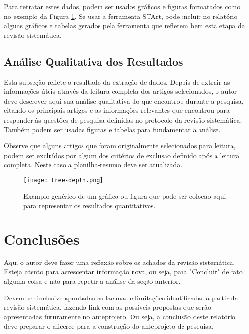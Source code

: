\documentclass[12pt]{article}
\begin{document}
Para retratar estes dados, podem ser usados gráficos e figuras formatados como no exemplo da Figura \ref{fig:depth}. Se usar a ferramenta STArt, pode incluir no relatório alguns gráficos e tabelas gerados pela ferramenta que refletem bem esta etapa da revisão sistemática.

\subsection{Análise Qualitativa dos Resultados}

Esta subseção reflete o resultado da extração de dados. Depois de extrair as informações úteis através da leitura completa dos artigos selecionados, o autor deve descrever aqui sua análise qualitativa do que encontrou durante a pesquisa, citando os principais artigos e as informações relevantes que encontrou para responder às questões de pesquisa definidas no protocolo da revisão sistemática. Também podem ser usadas figuras e tabelas para fundamentar a análise.

Observe que alguns artigos que foram originalmente selecionados para leitura, podem ser excluídos por algum dos critérios de exclusão definido após a leitura completa. Neste caso a planilha-resumo deve ser atualizada.

\begin{figure}[tb]
    \centering
    \texttt{[image: tree-depth.png]}
    \caption{Exemplo genérico de um gráfico ou figura que pode ser colocao aqui para representar os resultados quantitativos.}
    \label{fig:depth}
\end{figure}

\section{Conclusões}

Aqui o autor deve fazer uma reflexão sobre os achados da revisão sistemática. Esteja atento para acrescentar informação nova, ou seja, para "Concluir" de fato alguma coisa e não para repetir a análise da seção anterior.

Devem ser inclusive apontadas as lacunas e limitações identificadas a partir da revisão sistemática, fazendo link com as possíveis propostas que serão apresentadas futuramente no anteprojeto. Ou seja, a conclusão deste relatório deve preparar o alicerce para a construção do anteprojeto de pesquisa.





\end{document}
